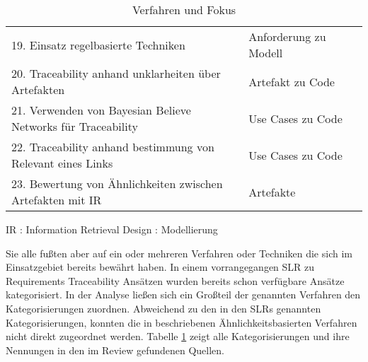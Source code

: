 \begin{table}[htbp]
\begin{threeparttable}
\begin{tabularx}{\columnwidth}{@{}XXl@{}}
19. Einsatz regelbasierte Techniken & Anforderung zu Modell & \cite{Mder2012TowardsMaintenance, Spanoudakis2004Rule-basedRelations} \\
20. Traceability anhand unklarheiten über Artefakten & Artefakt zu Code & \cite{Ghabi2015ExploitingCode} \\
21. Verwenden von Bayesian Believe Networks für Traceability & Use Cases zu Code & \cite{Omoronyia2011ExploringTraceability} \\
22. Traceability anhand bestimmung von Relevant eines Links & Use Cases zu Code & \cite{Omoronyia2011ExploringTraceability} \\
23. Bewertung von Ähnlichkeiten zwischen Artefakten mit IR & Artefakte & \cite{Bavota2014EnhancingInformation} \\
\bottomrule
\end{tabularx}
\medskip
    IR : Information Retrieval
    Design : Modellierung
\end{threeparttable}
\caption{Verfahren und Fokus}
\label{tab:auswertung_verfahren_kategorisierung}
\end{table}

Sie alle fußten aber auf ein oder mehreren Verfahren oder Techniken die sich im Einsatzgebiet bereits bewährt haben. In einem vorrangegangen SLR zu Requirements Traceability Ansätzen \cite{Javed2014ACode, Mader2012TowardsMaintenance} wurden bereits schon verfügbare Ansätze kategorisiert. In der Analyse ließen sich ein Großteil der genannten Verfahren den Kategorisierungen zuordnen. Abweichend zu den in den SLRs genannten Kategorisierungen, konnten die in \cite{Tsuchiya2015InteractiveLogs, Omoronyia2011ExploringTraceability, Leuser2010TacklingSpecifications, Spanoudakis2004Rule-basedRelations} beschriebenen Ähnlichkeitsbasierten Verfahren nicht direkt zugeordnet werden. Tabelle \ref{tab:auswertung_verfahren_kategorisierung} zeigt alle Kategorisierungen und ihre Nennungen in den im Review gefundenen Quellen.

